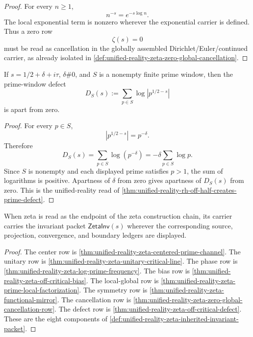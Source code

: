 \begin{proof}
For every $n\ge1$,
$$
n^{-s}=e^{-s\log n}.
$$
The local exponential term is nonzero wherever the exponential carrier is
defined. Thus a zero row
$$
\zeta(s)=0
$$
must be read as cancellation in the globally assembled
Dirichlet/Euler/continued carrier, as already isolated in
\autoref{def:unified-reality-zeta-zero-global-cancellation}.
\end{proof}

\begin{theorem}
\label{thm:unified-reality-zeta-off-critical-defect}
If $s=1/2+\delta+i\tau$, $\delta\#0$, and $S$ is a nonempty finite prime
window, then the prime-window defect
$$
D_S(s):=\sum_{p\in S}\log|p^{1/2-s}|
$$
is apart from zero.
\end{theorem}

\begin{proof}
For every $p\in S$,
$$
|p^{1/2-s}|=p^{-\delta}.
$$
Therefore
$$
D_S(s)
=
\sum_{p\in S}\log(p^{-\delta})
=
-\delta\sum_{p\in S}\log p.
$$
Since $S$ is nonempty and each displayed prime satisfies $p>1$, the sum
of logarithms is positive. Apartness of $\delta$ from zero gives
apartness of $D_S(s)$ from zero. This is the unified-reality read of
\autoref{thm:unified-reality-rh-off-half-creates-prime-defect}.
\end{proof}

\begin{theorem}
\label{thm:unified-reality-zeta-carries-inherited-invariant-packet}
When zeta is read as the endpoint of the zeta construction chain, its
carrier carries the invariant packet $\mathsf{ZetaInv}(s)$ wherever the
corresponding source, projection, convergence, and boundary ledgers are
displayed.
\end{theorem}

\begin{proof}
The center row is
\autoref{thm:unified-reality-zeta-centered-prime-channel}. The unitary
row is
\autoref{thm:unified-reality-zeta-unitary-critical-line}. The phase row
is
\autoref{thm:unified-reality-zeta-log-prime-frequency}. The bias row is
\autoref{thm:unified-reality-zeta-off-critical-bias}. The local-global
row is
\autoref{thm:unified-reality-zeta-prime-local-factorization}. The
symmetry row is
\autoref{thm:unified-reality-zeta-functional-mirror}. The cancellation
row is
\autoref{thm:unified-reality-zeta-zero-global-cancellation-row}. The
defect row is
\autoref{thm:unified-reality-zeta-off-critical-defect}. These are the
eight components of
\autoref{def:unified-reality-zeta-inherited-invariant-packet}.
\end{proof}

